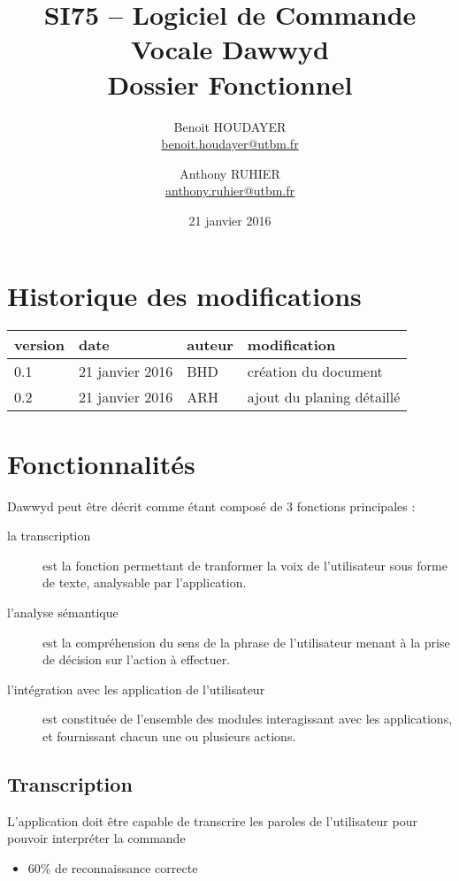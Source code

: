 \documentclass[12pt]{article}
\title{\textbf{SI75 -- Logiciel de Commande Vocale Dawwyd\\[0.5em]Dossier Fonctionnel}}
\author{Benoit HOUDAYER \\ \href{mailto:benoit.houdayer@utbm.fr}{benoit.houdayer@utbm.fr}
\and Anthony RUHIER \\ \href{mailto:anthony.ruhier@utbm.fr}{anthony.ruhier@utbm.fr}}
\date{21 janvier 2016}
\begin{document}
    \maketitle
    \thispagestyle{empty}
    \tableofcontents
    \listoffigures

    \section*{Historique des modifications}

    \begin{table}
    \centering

    \begin{tabular}{|l|l|l|l|}
        \hline
        version & date & auteur & modification \\
        \hline
        0.1 & 21 janvier 2016 & BHD & création du document \\
        0.2 & 21 janvier 2016 & ARH & ajout du planing détaillé \\
        \hline
    \end{tabular}
    \end{table}

    \afterpage{\cfoot{\thepage}}
    \newpage

    \section{Fonctionnalités}
    Dawwyd peut être décrit comme étant composé de 3 fonctions principales :
    \begin{description}
        \item[la transcription] est la fonction permettant de tranformer la voix
            de l'utilisateur sous forme de texte, analysable par l'application.
        \item[l'analyse sémantique] est la compréhension du sens de la phrase
            de l'utilisateur menant à la prise de décision sur
            l'action à effectuer.
        \item[l'intégration avec les application de l'utilisateur] est constituée
            de l'ensemble des modules interagissant avec les applications,
            et fournissant chacun une ou plusieurs actions.
    \end{description}

    \subsection{Transcription}
    L'application doit être capable de transcrire
    les paroles de l'utilisateur pour pouvoir interpréter la
    commande
    \begin{itemize}
        \item 60\% de reconnaissance correcte
    \end{itemize}
\end{document}
